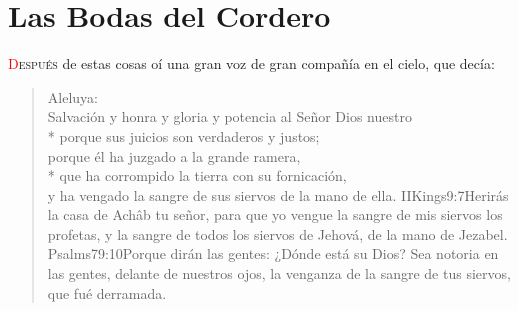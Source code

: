 
\chapter{Las Bodas del Cordero}
\lettrine[lines=2,lraise=0.1]{\textcolor{red}{D}}{espués} de estas cosas oí una gran voz de gran compañía%
 en el cielo, que decía:
\zz \begin{verse}
Aleluya:\\
Salvación y honra y gloria y potencia al Señor Dios nuestro\\*\vin
{}porque sus juicios son verdaderos y justos;\\
porque él ha juzgado a la grande ramera,\\*\vin
que ha corrompido la tierra con su fornicación,\\
y ha vengado la sangre de sus siervos de la mano de ella.%
				{IIKings}{9:7}{Herirás la casa de Achâb tu señor, para que yo vengue la sangre de mis siervos los profetas, y la sangre de todos los siervos de Jehová, de la mano de Jezabel.}%
				{Psalms}{79:10}{Porque dirán las gentes: ¿Dónde está su Dios? Sea notoria en las gentes, delante de nuestros ojos, la venganza de la sangre de tus siervos, que fué derramada.}
\end{verse}

